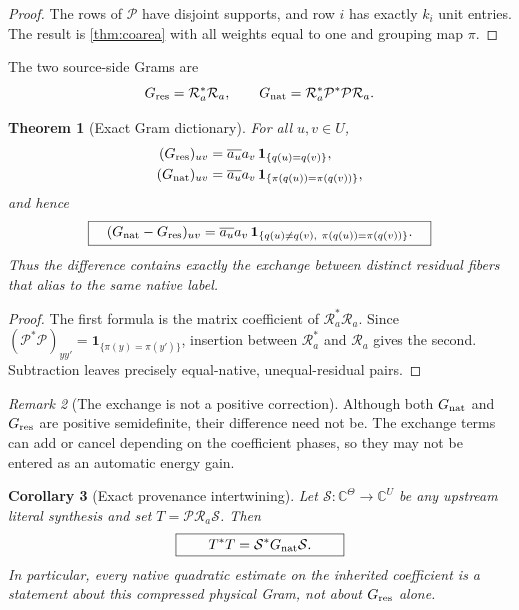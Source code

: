 \documentclass[11pt]{article}
\newtheorem{theorem}{Theorem}[section]
\newtheorem{corollary}[theorem]{Corollary}
\theoremstyle{definition}
\theoremstyle{remark}
\newtheorem{remark}[theorem]{Remark}
\newcommand{\C}{\mathbb C}
\newcommand{\one}{\mathbf 1}
\newcommand{\Res}{\mathcal R}
\newcommand{\Nat}{\mathcal P}
\newcommand{\Syn}{\mathcal S}
\begin{document}
\begin{proof}
The rows of \(\Nat\) have disjoint supports, and row \(i\) has exactly
\(k_i\) unit entries.  The result is \cref{thm:coarea} with all
weights equal to one and grouping map \(\pi\).
\end{proof}

The two source-side Grams are
\[
 G_{\rm res}=\Res_a^*\Res_a,\qquad
 G_{\rm nat}=\Res_a^*\Nat^*\Nat\Res_a.
\]

\begin{theorem}[Exact Gram dictionary]
\label{thm:dictionary}
For all \(u,v\in U\),
\begin{align*}
 (G_{\rm res})_{uv}
 &=\overline{a_u}a_v\,\one_{\{q(u)=q(v)\}},\\
 (G_{\rm nat})_{uv}
 &=\overline{a_u}a_v\,
   \one_{\{\pi(q(u))=\pi(q(v))\}},
\end{align*}
and hence
\[
 \boxed{\quad
 (G_{\rm nat}-G_{\rm res})_{uv}
 =\overline{a_u}a_v\,
  \one_{\{q(u)\ne q(v),\ \pi(q(u))=\pi(q(v))\}}.
 \quad}
\]
Thus the difference contains exactly the exchange between distinct
residual fibers that alias to the same native label.
\end{theorem}

\begin{proof}
The first formula is the matrix coefficient of
\(\Res_a^*\Res_a\).  Since
\((\Nat^*\Nat)_{yy'}=\one_{\{\pi(y)=\pi(y')\}}\), insertion between
\(\Res_a^*\) and \(\Res_a\) gives the second.  Subtraction leaves
precisely equal-native, unequal-residual pairs.
\end{proof}

\begin{remark}[The exchange is not a positive correction]
Although both \(G_{\rm nat}\) and \(G_{\rm res}\) are positive
semidefinite, their difference need not be.  The exchange terms can
add or cancel depending on the coefficient phases, so they may not be
entered as an automatic energy gain.
\end{remark}

\begin{corollary}[Exact provenance intertwining]
\label{cor:intertwining}
Let \(\Syn:\C^\Theta\to\C^U\) be any upstream literal synthesis and
set \(T=\Nat\Res_a\Syn\).  Then
\[
 \boxed{\qquad T^*T=\Syn^*G_{\rm nat}\Syn.\qquad}
\]
In particular, every native quadratic estimate on the inherited
coefficient is a statement about this compressed physical Gram, not
about \(G_{\rm res}\) alone.
\end{corollary}
\end{document}
